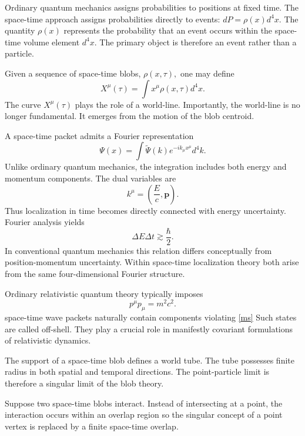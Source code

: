 Ordinary quantum mechanics assigns probabilities to positions at fixed time.
The space-time approach assigns probabilities directly to events:
$dP = \rho(x)d^4x.$
The quantity $ \rho(x) $
represents the probability that an event occurs within the space-time 
volume element $d^4x.$
The primary object is therefore an event rather than a particle.

Given a sequence of space-time blobs,
$\rho(x,\tau),$ one may define
\[X^\mu(\tau)=\int x^\mu \rho(x,\tau)d^4x.\]
The curve $X^\mu(\tau)$
plays the role of a world-line.
Importantly, the world-line is no longer fundamental.
It emerges from the motion of the blob centroid.

A space-time packet admits a Fourier representation
\begin{equation}
    \label{ft1}
\Psi(x) = \int \tilde\Psi(k) e^{-ik_\mu x^\mu}d^4k.
\end{equation}
Unlike ordinary quantum mechanics, the integration includes both energy 
and momentum components.
The dual variables are
\begin{equation}
    \label{ft2}
k^\mu = \left(\frac{E}{c},\mathbf{p}\right).
\end{equation}
Thus localization in time becomes directly connected with energy uncertainty.
Fourier analysis yields
\begin{equation}
    \label{ft3}
\Delta E \Delta t \gtrsim \frac{\hbar}{2}.
\end{equation}
In conventional quantum mechanics this relation differs conceptually 
from position-momentum uncertainty.
Within space-time localization theory both arise from the same four-dimensional
Fourier structure.

Ordinary relativistic quantum theory typically imposes
\begin{equation}
    \label{ms}
p^\mu p_\mu = m^2c^2.
\end{equation}
space-time wave packets naturally contain components violating \eqref{ms}
Such states are called off-shell.
They play a crucial role in manifestly covariant formulations of 
relativistic dynamics.

The support of a space-time blob defines a world tube.
The tube possesses finite radius in both spatial and temporal directions.
The point-particle limit is therefore a singular limit of the blob theory.

Suppose two space-time blobs interact.
Instead of intersecting at a point, the interaction occurs within 
an overlap region  so
the singular concept of a point vertex is replaced by a finite space-time overlap.

